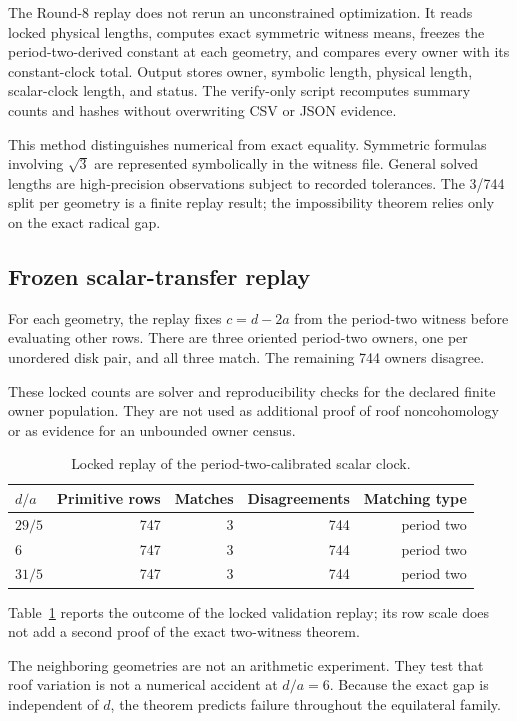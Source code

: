 \documentclass[11pt,a4paper]{article}
\theoremstyle{definition}
\theoremstyle{remark}
\begin{document}
The Round-8 replay does not rerun an unconstrained optimization. It reads locked physical lengths, computes exact symmetric witness means, freezes the period-two-derived constant at each geometry, and compares every owner with its constant-clock total. Output stores owner, symbolic length, physical length, scalar-clock length, and status. The verify-only script recomputes summary counts and hashes without overwriting CSV or JSON evidence.

This method distinguishes numerical from exact equality. Symmetric formulas involving \(\sqrt3\) are represented symbolically in the witness file. General solved lengths are high-precision observations subject to recorded tolerances. The 3/744 split per geometry is a finite replay result; the impossibility theorem relies only on the exact radical gap.

\subsection{Frozen scalar-transfer replay}

For each geometry, the replay fixes \(c=d-2a\) from the period-two witness before evaluating other rows. There are three oriented period-two owners, one per unordered disk pair, and all three match. The remaining 744 owners disagree.

These locked counts are solver and reproducibility checks for the declared finite owner population. They are not used as additional proof of roof noncohomology or as evidence for an unbounded owner census.

\begin{table}[t]
\centering
\caption{Locked replay of the period-two-calibrated scalar clock.}
\label{tab:replay}
\begin{tabular}{lrrrr}
\toprule
\(d/a\) & Primitive rows & Matches & Disagreements & Matching type \\
\midrule
\(29/5\) & 747 & 3 & 744 & period two \\
\(6\) & 747 & 3 & 744 & period two \\
\(31/5\) & 747 & 3 & 744 & period two \\
\bottomrule
\end{tabular}
\end{table}

Table~\ref{tab:replay} reports the outcome of the locked validation replay; its row scale does not add a second proof of the exact two-witness theorem.

The neighboring geometries are not an arithmetic experiment. They test that roof variation is not a numerical accident at \(d/a=6\). Because the exact gap is independent of \(d\), the theorem predicts failure throughout the equilateral family.
\end{document}

